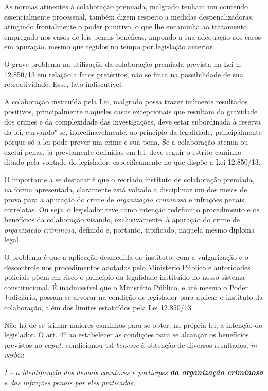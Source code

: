 As normas atinentes à colaboração premiada, malgrado tenham um conteúdo
essencialmente processual, também dizem respeito a medidas
despenalizadoras, atingindo frontalmente o poder punitivo, o que lhe
encaminha ao tratamento empregado nos casos de leis penais benéficas,
impondo a sua adequação aos casos em apuração, mesmo que regidos no
tempo por legislação anterior.

O grave problema na utilização da colaboração premiada prevista na Lei
n. 12.850/13 em relação a fatos pretéritos, não se finca na
possibilidade de sua retroatividade. Esse, fato indiscutível.

A colaboração instituída pela Lei, malgrado possa trazer inúmeros
resultados positivos, principalmente naqueles casos excepcionais que
resultam da gravidade dos crimes e da complexidade das investigações,
deve estar subordinada à reserva da lei, curvando"-se, indeclinavelmente,
ao princípio da legalidade, principalmente porque só a lei pode prever
um crime e sua pena. Se a colaboração atenua ou exclui penas, já
previamente definidas em lei, deve seguir o estrito caminho ditado pela
vontade do legislador, especificamente no que dispõe a Lei 12.850/13.

O importante a se destacar é que o recriado instituto de colaboração
premiada, na forma apresentada, claramente está voltado a disciplinar um
dos meios de prova para a apuração do crime de \emph{organização
criminosa} e infrações penais correlatas. Ou seja, o legislador teve
como intenção redefinir o procedimento e os benefícios da colaboração
visando, exclusivamente, à apuração do crime de \emph{organização
criminosa}, definido e, portanto, tipificado, naquela mesmo diploma
legal.

O problema é que a aplicação desmedida do instituto, com a vulgarização
e o descontrole nos procedimentos adotados pelo Ministério Público e
autoridades policiais põem em risco o princípio da legalidade instituído
no nosso sistema constitucional. É inadmissível que o Ministério
Público, e até mesmo o Poder Judiciário, possam se arvorar na condição
de legislador para aplicar o instituto da colaboração, além dos limites
estatuídos pela Lei 12.850/13.

Não há de se trilhar maiores caminhos para se obter, na própria lei, a
intenção do legislador. O art. 4º ao estabelecer as condições para se
alcançar os benefícios previstos no \emph{caput,} condicionou tal
\emph{benesse} à obtenção de diversos resultados, \emph{in verbis}:

\emph{I -- a identificação dos demais coautores e partícipes \textbf{da
organização criminosa} e das infrações penais por eles praticadas};


